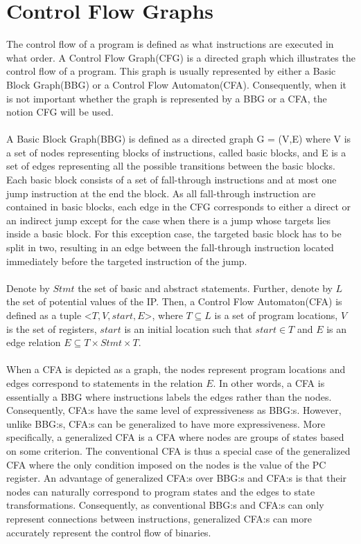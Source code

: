 \documentclass{kththesis}
\begin{document}
\section{Control Flow Graphs}
The control flow of a program is defined as what instructions are executed in what order. A Control Flow Graph(CFG) is a directed graph which illustrates the control flow of a program. This graph is usually represented by either a Basic Block Graph(BBG) or a Control Flow Automaton(CFA). Consequently, when it is not important whether the graph is represented by a BBG or a CFA, the notion CFG will be used. 
\\ \\
A Basic Block Graph(BBG) is defined as a directed graph G = (V,E) where V is a set of nodes representing blocks of instructions, called basic blocks, and E is a set of edges representing all the possible transitions between the basic blocks. Each basic block consists of a set of fall-through instructions and at most one jump instruction at the end the block. As all fall-through instruction are contained in basic blocks, each edge in the CFG corresponds to either a direct or an indirect jump except for the case when there is a jump whose targets lies inside a basic block. For this exception case, the targeted basic block has to be split in two, resulting in an edge between the fall-through instruction located immediately before the targeted instruction of the jump. 
\\ \\ 
Denote by $Stmt$ the set of basic and abstract statements. Further, denote by $L$ the set of potential values of the IP. Then, a Control Flow Automaton(CFA) is defined as a tuple <$T,V,start,E$>, where $T \subseteq L$ is a set of program locations, $V$ is the set of registers, $start$ is an initial location such that $start \in T$ and $E$ is an edge relation $E \subseteq T \times Stmt \times T$. 
\\ \\
When a CFA is depicted as a graph, the nodes represent program locations and edges correspond to statements in the relation $E$. In other words, a CFA is essentially a BBG where instructions labels the edges rather than the nodes. Consequently, CFA:s have the same level of expressiveness as BBG:s. However, unlike BBG:s, CFA:s can be generalized to have more expressiveness. More specifically, a generalized CFA is a CFA where nodes are groups of states based on some criterion. The conventional CFA is thus a special case of the generalized CFA where the only condition imposed on the nodes is the value of the PC register. An advantage of generalized CFA:s over BBG:s and CFA:s is that their nodes can naturally correspond to program states and the edges to state transformations. Consequently, as conventional BBG:s and CFA:s can only represent connections between instructions, generalized CFA:s can more accurately represent the control flow of binaries.
\end{document}
